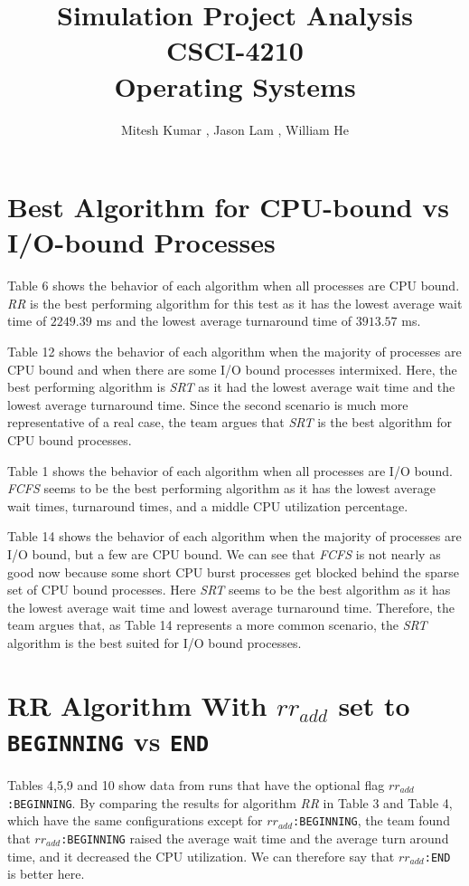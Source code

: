 \documentclass{article}
\title{\textbf{Simulation Project Analysis} \\ 
       \textbf{CSCI-4210} \\ 
       \textbf{Operating Systems}}
\author{Mitesh Kumar {\tt <kumarm4>}, Jason Lam {\tt <lamj7>}, William He {\tt <hew7>}}
\begin{document}
\maketitle
\tableofcontents

\section{Best Algorithm for CPU-bound vs I/O-bound Processes}
\begin{doublespace}

Table 6 shows the behavior of each algorithm when all processes are CPU bound. \textit{RR} is the best performing
algorithm for this test as it has the lowest average wait time of $2249.39$ ms and the lowest average turnaround 
time of $3913.57$ ms.

Table 12 shows the behavior of each algorithm when the majority of processes are CPU bound and when there are some 
I/O bound processes intermixed. Here, the best performing algorithm is \textit{SRT} as it had the lowest 
average wait time and the lowest average turnaround time. Since the second scenario is much more representative of 
a real case, the team argues that \textit{SRT} is the best algorithm for CPU bound processes.

Table 1 shows the behavior of each algorithm when all processes are I/O bound. \textit{FCFS} seems to be the best 
performing algorithm as it has the lowest average wait times, turnaround times, and a middle CPU utilization percentage.

Table 14 shows the behavior of each algorithm when the majority of processes are I/O bound, but a few are CPU bound. We 
can see that \textit{FCFS} is not nearly as good now because some short CPU burst processes get blocked behind the 
sparse set of CPU bound processes. Here \textit{SRT} seems to be the best algorithm as it has the lowest average wait time
and lowest average turnaround time. Therefore, the team argues that, as Table 14 represents a more common scenario, the \textit{SRT}
algorithm is the best suited for I/O bound processes.
\end{doublespace}

\section{RR Algorithm With {\tt $rr_{add}$} set to {\tt BEGINNING} vs {\tt END}}
\begin{doublespace}
Tables 4,5,9 and 10 show data from runs that have the optional flag {\tt $rr_{add}$:BEGINNING}. 
By comparing the results for algorithm \textit{RR} in  Table 3 and Table 4, which have the same configurations except for {\tt $rr_{add}$:BEGINNING}, 
the team found that {\tt $rr_{add}$:BEGINNING} raised the average wait time and the average turn around time, and it decreased the 
CPU utilization. We can therefore say that {\tt $rr_{add}$:END} is better here. 
\end{doublespace}
\end{document}

